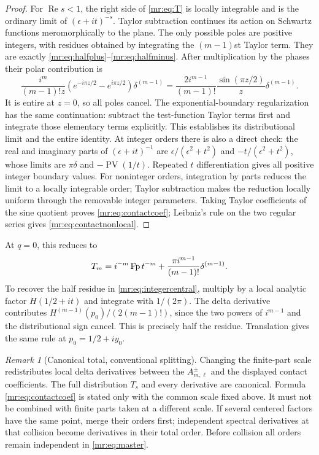 \documentclass[11pt,letterpaper]{article}
\theoremstyle{definition}\newtheorem{definition}[theorem]{Definition}
\theoremstyle{remark}\newtheorem{remark}[theorem]{Remark}
\newcommand{\Rea}{\operatorname{Re}}\newcommand{\Ima}{\operatorname{Im}}
\begin{document}
\begin{proof}
For $\Rea s<1$, the right side of \eqref{mr:eq:T} is locally
integrable and is the ordinary limit of $(\epsilon+it)^{-s}$.
Taylor subtraction continues its action on Schwartz functions
meromorphically to the plane. The only possible poles are positive
integers, with residues obtained by integrating the $(m-1)$st Taylor
term. They are exactly \eqref{mr:eq:halfplus}--\eqref{mr:eq:halfminus}.
After multiplication by the phases their polar contribution is
\[
 \frac{i^m}{(m-1)!z}
     (e^{-i\pi z/2}-e^{i\pi z/2})\delta^{(m-1)}
 =\frac{2i^{m-1}}{(m-1)!}\frac{\sin(\pi z/2)}z\delta^{(m-1)}.
\]
It is entire at $z=0$, so all poles cancel. The exponential-boundary
regularization has the same continuation: subtract the test-function
Taylor terms first and integrate those elementary terms explicitly.
This establishes its distributional limit and the entire identity.
At integer orders there is also a direct check: the real and imaginary
parts of $(\epsilon+it)^{-1}$ are
$\epsilon/(\epsilon^2+t^2)$ and $-t/(\epsilon^2+t^2)$, whose limits
are $\pi\delta$ and $-\operatorname{PV}(1/t)$. Repeated
$t$ differentiation gives all positive integer boundary values.
For noninteger orders, integration by parts reduces the limit to a
locally integrable order; Taylor subtraction makes the reduction
locally uniform through the removable integer parameters.
Taking Taylor coefficients of the sine quotient proves
\eqref{mr:eq:contactcoef}; Leibniz's rule on the two regular series gives
\eqref{mr:eq:contactnonlocal}.
\end{proof}
At $q=0$, this reduces to
\begin{equation}\label{mr:eq:plemelj}
 T_m=i^{-m}\operatorname{Fp} t^{-m}
       +\frac{\pi i^{m-1}}{(m-1)!}\delta^{(m-1)}.
\end{equation}
To recover the half residue in \eqref{mr:eq:integercentral}, multiply
by a local analytic factor $H(1/2+it)$ and integrate with $1/(2\pi)$.
The delta derivative contributes
$H^{(m-1)}(p_0)/(2(m-1)!)$, since the two powers of $i^{m-1}$ and
the distributional sign cancel. This is precisely half the residue.
Translation gives the same rule at $p_0=1/2+iy_0$.

\begin{remark}[Canonical total, conventional splitting]
Changing the finite-part scale redistributes local delta derivatives
between the $A_{m,\ell}^{\pm}$ and the displayed contact coefficients.
The full distribution $T_s$ and every derivative are canonical.
Formula \eqref{mr:eq:contactcoef} is stated only with the common scale
fixed above. It must not be combined with finite parts taken at a
different scale. If several centered factors have the same point,
merge their orders first; independent spectral derivatives at that
collision become derivatives in their total order. Before collision
all orders remain independent in \eqref{mr:eq:master}.
\end{remark}
\end{document}

